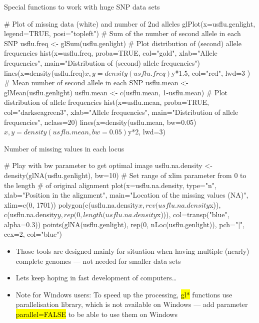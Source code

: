 \documentclass[compress, ucs, xelatex, 11pt, xcolor=svgnames,
  hyperref={
    bookmarks=true,
    unicode=true,
    colorlinks=true,
    pdftitle={Molecular data in R},
    plainpages=false,
    pdfauthor={Vojtech Zeisek},
    pdfsubject={Course about phylogeny and evolution in R},
    pdfcreator={XeLaTeX},
    pdfkeywords={R, evolution, phylogeny, molecular data},
    linkcolor=Tomato,
    anchorcolor=SaddleBrown,
    citecolor=Goldenrod,
    filecolor=DarkMagenta,
    menucolor=Sienna,
    urlcolor=DarkTurquoise,
    pdftex},
  url={hyphens, lowtilde} %
  ]{beamer}
\renewcommand{\texttt}[1]{\hl{\ttfamily #1}}
\begin{document}
\begin{frame}[fragile]{Special functions to work with huge SNP data sets}
  \begin{spluscode}
    # Plot of missing data (white) and number of 2nd alleles
    glPlot(x=usflu.genlight, legend=TRUE, posi="topleft")
    # Sum of the number of second allele in each SNP
    usflu.freq <- glSum(usflu.genlight)
    # Plot distribution of (second) allele frequencies
    hist(x=usflu.freq, proba=TRUE, col="gold", xlab="Allele
      frequencies", main="Distribution of (second) allele frequencies")
    lines(x=density(usflu.freq)$x, y=density(usflu.freq)$y*1.5,
      col="red", lwd=3 )
    # Mean number of second allele in each SNP
    usflu.mean <- glMean(usflu.genlight)
    usflu.mean <- c(usflu.mean, 1-usflu.mean)
    # Plot distribution of allele frequencies
    hist(x=usflu.mean, proba=TRUE, col="darkseagreen3",
      xlab="Allele frequencies", main="Distribution of allele
      frequencies", nclass=20)
    lines(x=density(usflu.mean, bw=0.05)$x, y=density(usflu.mean,
      bw=0.05)$y*2, lwd=3)
  \end{spluscode}
\end{frame}

\begin{frame}[fragile]{Number of missing values in each locus}
  \begin{spluscode}
    # Play with bw parameter to get optimal image
    usflu.na.density <- density(glNA(usflu.genlight), bw=10)
    # Set range of xlim parameter from 0 to the length
    # of original alignment
    plot(x=usflu.na.density, type="n", xlab="Position in the alignment",
      main="Location of the missing values (NA)", xlim=c(0, 1701))
    polygon(c(usflu.na.density$x, rev(usflu.na.density$x)),
      c(usflu.na.density$y, rep(0, length(usflu.na.density$x))),
      col=transp("blue", alpha=0.3))
    points(glNA(usflu.genlight), rep(0, nLoc(usflu.genlight)), 
      pch="|", cex=2, col="blue")
  \end{spluscode}
  \begin{itemize}
    \item Those tools are designed mainly for situation when having multiple (nearly) complete genomes --- not needed for smaller data sets
    \item Lets keep hoping in fast development of computers\ldots
    \item \alert{Note for Windows users:} To speed up the processing, \texttt{gl*} functions use parallelisation library, which is not available on Windows --- add parameter \texttt{parallel=FALSE} to be able to use them on Windows
  \end{itemize}
\end{frame}
\end{document}
